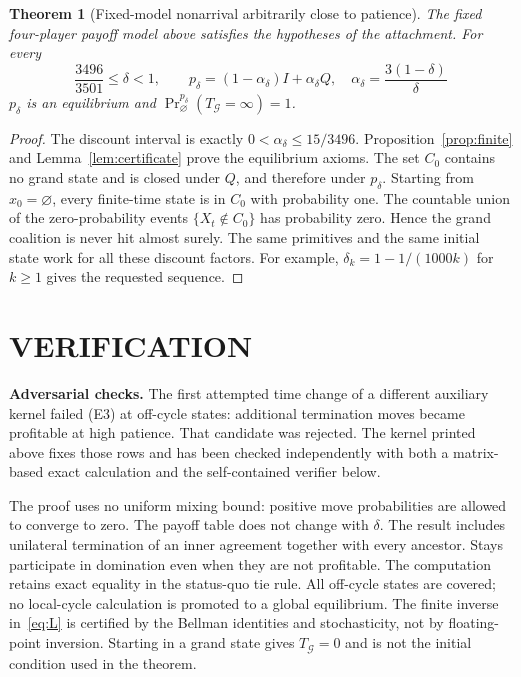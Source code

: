 \documentclass[11pt,a4paper]{article}
\newtheorem{theorem}{Theorem}[section]
\theoremstyle{definition}\newtheorem{definition}[theorem]{Definition}
\theoremstyle{remark}\newtheorem{remark}[theorem]{Remark}
\newcommand{\1}{\mathbf 1}
\begin{document}
\begin{theorem}[Fixed-model nonarrival arbitrarily close to patience]\label{thm:main}
The fixed four-player payoff model above satisfies the hypotheses of the attachment. For every
\[
 \boxed{\quad\frac{3496}{3501}\le\delta<1,\qquad
 p_\delta=(1-\alpha_\delta)I+\alpha_\delta Q,
 \quad \alpha_\delta=\frac{3(1-\delta)}{\delta}\quad}
\]
$p_\delta$ is an equilibrium and
$\Pr^{p_\delta}_{\varnothing}(T_{\mathcal G}=\infty)=1$.
\end{theorem}
\begin{proof}
The discount interval is exactly $0<\alpha_\delta\le15/3496$. Proposition~\ref{prop:finite} and Lemma~\ref{lem:certificate} prove the equilibrium axioms. The set $C_0$ contains no grand state and is closed under $Q$, and therefore under $p_\delta$. Starting from $x_0=\varnothing$, every finite-time state is in $C_0$ with probability one. The countable union of the zero-probability events $\{X_t\notin C_0\}$ has probability zero. Hence the grand coalition is never hit almost surely. The same primitives and the same initial state work for all these discount factors. For example, $\delta_k=1-1/(1000k)$ for $k\ge1$ gives the requested sequence.
\end{proof}

\section{VERIFICATION}
\textbf{Adversarial checks.} The first attempted time change of a different auxiliary kernel failed (E3) at off-cycle states: additional termination moves became profitable at high patience. That candidate was rejected. The kernel printed above fixes those rows and has been checked independently with both a matrix-based exact calculation and the self-contained verifier below.

The proof uses no uniform mixing bound: positive move probabilities are allowed to converge to zero. The payoff table does not change with $\delta$. The result includes unilateral termination of an inner agreement together with every ancestor. Stays participate in domination even when they are not profitable. The computation retains exact equality in the status-quo tie rule. All off-cycle states are covered; no local-cycle calculation is promoted to a global equilibrium. The finite inverse in~\eqref{eq:L} is certified by the Bellman identities and stochasticity, not by floating-point inversion. Starting in a grand state gives $T_{\mathcal G}=0$ and is not the initial condition used in the theorem.
\end{document}
